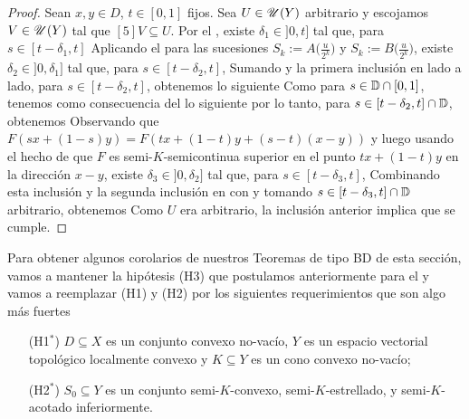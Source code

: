 \begin{proof}
	Sean $x,y\in D$, $t\in[0,1]$ fijos. Sea $U\in\mathscr{U}(Y)$  arbitrario y escojamos
	$V\in\mathscr{U}(Y)$ tal que $[5]V\subseteq U$. Por el , existe $\delta_1\in]0,t]$
	tal que, para $s\in[t-\delta_1,t]$
	Aplicando el  para las sucesiones $S_k:=A\big(\frac{u}{2^k}\big)$
	y $S_k:=B\big(\frac{u}{2^k}\big)$, existe $\delta_2\in]0,\delta_1]$
	tal que, para $s\in[t-\delta_2,t]$,
	Sumando  y la primera inclusi\'on en  lado a lado, 
	para $s\in[t-\delta_2,t]$, obtenemos lo siguiente
	Como para $s\in\mathbb{D}\cap[0,1]$, tenemos como consecuencia del 
	lo siguiente
	por lo tanto, para $s\in[t-\delta_2,t]\cap\mathbb{D}$, obtenemos
	Observando que $F(sx+(1-s)y)=F(tx+(1-t)y+(s-t)(x-y))$ y luego usando el hecho
	de que $F$ es semi-$K$-semicontinua superior en el punto $tx+(1-t)y$ 
	en la direcci\'on $x-y$, existe $\delta_3\in]0,\delta_2]$ tal que, para 
	$s\in[t-\delta_3,t]$,
	Combinando esta inclusi\'on y la segunda inclusi\'on en 
	con  y tomando $s\in[t-\delta_3,t]\cap\mathbb{D}$
	arbitrario, obtenemos
	Como $U$ era arbitrario, la inclusi\'on anterior implica que 
	se cumple.
\end{proof}

Para obtener algunos corolarios de nuestros Teoremas de tipo BD
de esta secci\'on, vamos a mantener la hip\'otesis (H3) que postulamos
anteriormente para el  y vamos a reemplazar (H1) y (H2)
por los siguientes requerimientos que son algo m\'as fuertes
\begin{enumerate}
	\item[(H1$^*$)] $D\subseteq X$ es un conjunto convexo no-vac\'io, $Y$ es un espacio
	vectorial topol\'ogico localmente convexo y $K\subseteq Y$ es un cono convexo no-vac\'io; 
	\item[(H2$^*$)] $S_0\subseteq Y$ es un conjunto semi-$K$-convexo, semi-$K$-estrellado, 
	y semi-$K$-acotado inferiormente. 
\end{enumerate}

